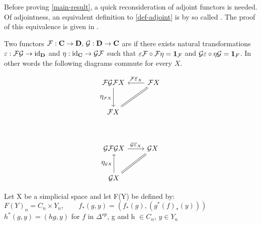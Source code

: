 \documentclass[../../main.tex]{subfiles}
\begin{document}
    Before proving \ref{main-result}, a quick reconsideration of adjoint functors is needed. 
    Of adjointness, an equivalent definition to \ref{def-adjoint} is by so called . The proof of this equivalence is given in \cite{cate-mac}.

    \begin{definition}
        Two functors $\functor{F}: \cat{C} \to \cat{D},\, \functor{G}: \cat{D} \to \cat{C}$ are  if there exists natural transformations $\varepsilon: \functor{FG} \to \mathrm{id}_\cat{D}$ and $\eta: \mathrm{id}_\cat{C} \to \functor{GF}$ such that $\varepsilon \functor{F} \circ \functor{F}\eta = \idarrow[\functor{F}]$ and $\functor{G}\varepsilon \circ \eta \functor{G} = \idarrow[F]$. In other words the following diagrams commute for every $X$.
    \end{definition}

    \begin{figure}[H]
        \begin{subfigure}[b]{0.5\textwidth}
            \[
                \begin{tikzcd}[row sep = large]
                    \functor{FGF}X \arrow[d,"\mathlarger{\eta}_{\functor{F}X}", swap] & \functor{F}X \arrow[l,"\functor{F}\mathlarger{\varepsilon}_X", swap]\\
                    \functor{F}X \arrow[ur, equal]
                \end{tikzcd}
            \]
        \end{subfigure}%
        ~
        \begin{subfigure}[b]{0.5\textwidth}
            \[
                \begin{tikzcd}[row sep = large]
                    \functor{GFG}X \arrow[r,"\functor{G} \mathlarger{\varepsilon}_X"] & \functor{G}X \\
                    \functor{G}X \arrow[u,"\mathlarger{\eta}_{\functor{G}X}"] \arrow[ur, equal]
                \end{tikzcd}
            \]
        \end{subfigure}
    \end{figure}

    \begin{definition}
        Let X be a simplicial space and let F(Y) be defined by:
        $F(Y)_n=C_n\times Y_n, \qquad f_*(g,y)=(f_*(g), (g^*(f)_*(y)))$
        $h^*(g,y) = (hg,y) $ for $f$ in $\Delta^{op}$, g and h $\in C_n$, $y\in Y_n$
    \end{definition}
\end{document}
